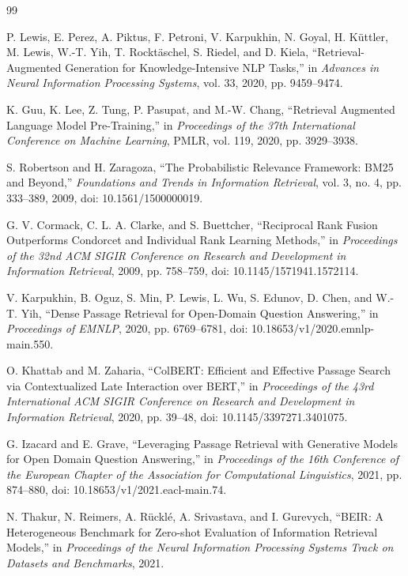 \documentclass[conference]{IEEEtran}
\begin{document}
\begin{thebibliography}{99}

P. Lewis, E. Perez, A. Piktus, F. Petroni,
V. Karpukhin, N. Goyal, H. K\"uttler,
M. Lewis, W.-T. Yih, T. Rockt\"aschel,
S. Riedel, and D. Kiela,
``Retrieval-Augmented Generation for
Knowledge-Intensive NLP Tasks,''
in \emph{Advances in Neural Information
Processing Systems}, vol. 33, 2020,
pp. 9459--9474.

K. Guu, K. Lee, Z. Tung, P. Pasupat,
and M.-W. Chang,
``Retrieval Augmented Language Model
Pre-Training,''
in \emph{Proceedings of the 37th
International Conference on Machine Learning},
PMLR, vol. 119, 2020, pp. 3929--3938.

S. Robertson and H. Zaragoza,
``The Probabilistic Relevance Framework:
BM25 and Beyond,''
\emph{Foundations and Trends in Information
Retrieval}, vol. 3, no. 4, pp. 333--389, 2009,
doi: 10.1561/1500000019.

G. V. Cormack, C. L. A. Clarke,
and S. Buettcher,
``Reciprocal Rank Fusion Outperforms
Condorcet and Individual Rank Learning
Methods,''
in \emph{Proceedings of the 32nd ACM SIGIR
Conference on Research and Development
in Information Retrieval}, 2009,
pp. 758--759,
doi: 10.1145/1571941.1572114.

V. Karpukhin, B. Oguz, S. Min, P. Lewis,
L. Wu, S. Edunov, D. Chen, and W.-T. Yih,
``Dense Passage Retrieval for Open-Domain
Question Answering,''
in \emph{Proceedings of EMNLP}, 2020,
pp. 6769--6781,
doi: 10.18653/v1/2020.emnlp-main.550.

O. Khattab and M. Zaharia,
``ColBERT: Efficient and Effective Passage
Search via Contextualized Late Interaction
over BERT,''
in \emph{Proceedings of the 43rd International
ACM SIGIR Conference on Research and
Development in Information Retrieval},
2020, pp. 39--48,
doi: 10.1145/3397271.3401075.

G. Izacard and E. Grave,
``Leveraging Passage Retrieval with Generative
Models for Open Domain Question Answering,''
in \emph{Proceedings of the 16th Conference
of the European Chapter of the Association
for Computational Linguistics}, 2021,
pp. 874--880,
doi: 10.18653/v1/2021.eacl-main.74.

N. Thakur, N. Reimers, A. R\"uckl\'e,
A. Srivastava, and I. Gurevych,
``BEIR: A Heterogeneous Benchmark for
Zero-shot Evaluation of Information
Retrieval Models,''
in \emph{Proceedings of the Neural Information
Processing Systems Track on Datasets and
Benchmarks}, 2021.


\end{thebibliography}
\end{document}
